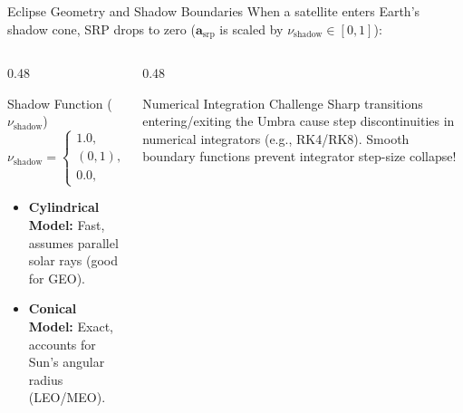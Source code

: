 \documentclass[aspectratio=169,11pt]{beamer}
\begin{document}
\begin{frame}{Eclipse Geometry and Shadow Boundaries}
    When a satellite enters Earth's shadow cone, SRP drops to zero ($\mathbf{a}_{\text{srp}}$ is scaled by $\nu_{\text{shadow}} \in [0, 1]$):

    \vspace{-0.1cm}

    \begin{columns}[t]
        \begin{column}{0.48\textwidth}
            \begin{block}{Shadow Function ($\nu_{\text{shadow}}$)}
                {\small
                \begin{equation*}
                    \nu_{\text{shadow}} = \begin{cases} 
                        1.0, & \text{Direct Sunlight} \\
                        (0, 1), & \text{Penumbra (Partial)} \\
                        0.0, & \text{Umbra (Total)}
                    \end{cases}
                \end{equation*}
                }
            \end{block}

            \small
            \begin{itemize}
                \item \textbf{Cylindrical Model:} Fast, assumes parallel solar rays (good for GEO).
                \item \textbf{Conical Model:} Exact, accounts for Sun's angular radius (LEO/MEO).
            \end{itemize}
        \end{column}

        \begin{column}{0.48\textwidth}
            \begin{alertblock}{Numerical Integration Challenge}
                \small
                Sharp transitions entering/exiting the Umbra cause step discontinuities in numerical integrators (e.g., RK4/RK8). Smooth boundary functions prevent integrator step-size collapse!
            \end{alertblock}
        \end{column}
    \end{columns}
\end{frame}
\end{document}
